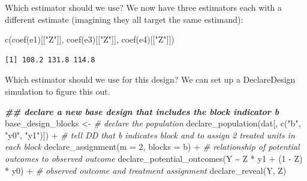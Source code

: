 \documentclass[
  ignorenonframetext,
]{beamer}
\newenvironment{Shaded}{\begin{snugshade}}{\end{snugshade}}
\newcommand{\AttributeTok}[1]{\textcolor[rgb]{0.77,0.63,0.00}{#1}}
\newcommand{\CommentTok}[1]{\textcolor[rgb]{0.56,0.35,0.01}{\textit{#1}}}
\newcommand{\DecValTok}[1]{\textcolor[rgb]{0.00,0.00,0.81}{#1}}
\newcommand{\DocumentationTok}[1]{\textcolor[rgb]{0.56,0.35,0.01}{\textbf{\textit{#1}}}}
\newcommand{\FunctionTok}[1]{\textcolor[rgb]{0.00,0.00,0.00}{#1}}
\newcommand{\NormalTok}[1]{#1}
\newcommand{\OtherTok}[1]{\textcolor[rgb]{0.56,0.35,0.01}{#1}}
\newcommand{\SpecialCharTok}[1]{\textcolor[rgb]{0.00,0.00,0.00}{#1}}
\newcommand{\StringTok}[1]{\textcolor[rgb]{0.31,0.60,0.02}{#1}}
\begin{document}
\begin{frame}[fragile]{Which estimator should we use?}
\protect\hypertarget{which-estimator-should-we-use}{}
We now have three estimators each with a different estimate (imagining
they all target the same estimand):

\scriptsize

\begin{Shaded}
\begin{Highlighting}[]
\FunctionTok{c}\NormalTok{(}\FunctionTok{coef}\NormalTok{(e1)[[}\StringTok{"Z"}\NormalTok{]], }\FunctionTok{coef}\NormalTok{(e3)[[}\StringTok{"Z"}\NormalTok{]], }\FunctionTok{coef}\NormalTok{(e4)[[}\StringTok{"Z"}\NormalTok{]])}
\end{Highlighting}
\end{Shaded}

\begin{verbatim}
[1] 108.2 131.8 114.8
\end{verbatim}

\normalsize

Which estimator should we use for this design? We can set up a
DeclareDesign simulation to figure this out.

\scriptsize

\begin{Shaded}
\begin{Highlighting}[]
\DocumentationTok{\#\# declare a new base design that includes the block indicator b}
\NormalTok{base\_design\_blocks }\OtherTok{\textless{}{-}}
  \CommentTok{\# declare the population}
  \FunctionTok{declare\_population}\NormalTok{(dat[, }\FunctionTok{c}\NormalTok{(}\StringTok{"b"}\NormalTok{, }\StringTok{"y0"}\NormalTok{, }\StringTok{"y1"}\NormalTok{)]) }\SpecialCharTok{+}
  \CommentTok{\# tell DD that b indicates block and to assign 2 treated units in each block}
  \FunctionTok{declare\_assignment}\NormalTok{(}\AttributeTok{m =} \DecValTok{2}\NormalTok{, }\AttributeTok{blocks =}\NormalTok{ b) }\SpecialCharTok{+}
  \CommentTok{\# relationship of potential outcomes to observed outcome}
  \FunctionTok{declare\_potential\_outcomes}\NormalTok{(Y }\SpecialCharTok{\textasciitilde{}}\NormalTok{ Z }\SpecialCharTok{*}\NormalTok{ y1 }\SpecialCharTok{+}\NormalTok{ (}\DecValTok{1} \SpecialCharTok{{-}}\NormalTok{ Z) }\SpecialCharTok{*}\NormalTok{ y0) }\SpecialCharTok{+}
  \CommentTok{\# observed outcome and treatment assignment}
  \FunctionTok{declare\_reveal}\NormalTok{(Y, Z)}
\end{Highlighting}
\end{Shaded}

\normalsize
\end{frame}
\end{document}
